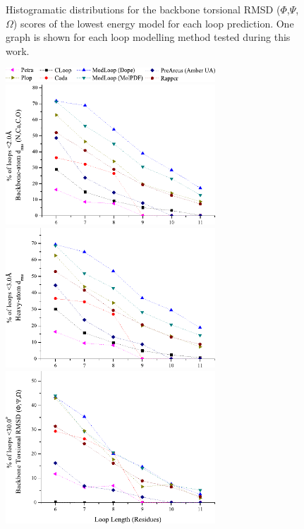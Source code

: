 \begin{figure}[hptb]
\begin{center}
    \caption[Histogramatic distributions for the backbone torsional RMSD ($\Phi$,$\Psi$,$\Omega$) scores 
    of the lowest energy model for each  loop prediction.]{Histogramatic distributions for the backbone torsional RMSD ($\Phi$,$\Psi$,$\Omega$) scores 
    of the lowest energy model for each  loop prediction. One graph is shown for each loop modelling 
    method tested during this work.}
    
    \label{fig:methcomp:hist_dist_bba_6}
    
  \end{center}
\end{figure}


\begin{figure}[hptb]
  \begin{center}
\includegraphics[width=0.7\textwidth]{08-MethodComparison/summary/key.pdf}\\[0.1cm]
\includegraphics[width=0.7\textwidth]{08-MethodComparison/summary/backbone.pdf}
\includegraphics[width=0.7\textwidth]{08-MethodComparison/summary/heavyatom.pdf}
\includegraphics[width=0.7\textwidth]{08-MethodComparison/summary/torsion.pdf}

\end{center}
\end{figure}

